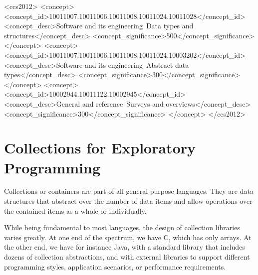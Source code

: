 \documentclass[sigconf, authorversion]{acmart}
\begin{document}
%
%
\begin{CCSXML}
<ccs2012>
<concept>
<concept_id>10011007.10011006.10011008.10011024.10011028</concept_id>
<concept_desc>Software and its engineering~Data types and structures</concept_desc>
<concept_significance>500</concept_significance>
</concept>
<concept>
<concept_id>10011007.10011006.10011008.10011024.10003202</concept_id>
<concept_desc>Software and its engineering~Abstract data types</concept_desc>
<concept_significance>300</concept_significance>
</concept>
<concept>
<concept_id>10002944.10011122.10002945</concept_id>
<concept_desc>General and reference~Surveys and overviews</concept_desc>
<concept_significance>300</concept_significance>
</concept>
</ccs2012>
\end{CCSXML}



\maketitle


\section{Collections for Exploratory Programming}


Collections or containers are part of all general purpose languages.
They are data structures that abstract over the number of data items
and allow operations over the contained items as a whole or individually.


While being fundamental to most languages,
the design of collection libraries varies greatly.
At one end of the spectrum, we have C, which has only arrays.
At the other end, we have for instance Java,
with a standard library that includes dozens of collection abstractions,
and with external libraries to support different programming styles,
application scenarios, or performance requirements.
\end{document}
